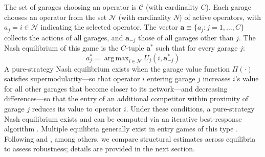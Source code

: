 \documentclass[12pt]{article}
\DeclareMathOperator*{\argmax}{arg\,max}
\begin{document}
The set of garages choosing an operator is $\mathcal{C}$ (with cardinality 
$C$). Each garage chooses an operator from the set $\mathcal{N}$ (with 
cardinality $N$) of active operators, with $a_{j} = i \in \mathcal{N}$ 
indicating the selected operator. The vector $\mathbf{a} \equiv \{a_{j} : j = 
1, \dots, C\}$ collects the actions of all garages, and $\mathbf{a}_{-j}$ 
those of all garages other than $j$. The Nash equilibrium of this game is the 
$C$-tuple $\mathbf{a}^*$ such that for every garage $j$:
\begin{equation}\label{eq:garagechoice}
a_{j}^* = \argmax_{i \in \mathcal{N}} U_{j}(i,\mathbf{a}_{-j}^*)
\end{equation}
\sloppy A pure-strategy Nash equilibrium exists when the garage value function 
$\Pi(\cdot)$ satisfies supermodularity---so that operator $i$ entering 
garage $j$ increases $i$'s value for all other garages that become closer 
to its network---and decreasing differences---so that the entry of an 
additional competitor within proximity of garage $j$ reduces its value to 
operator $i$. Under these conditions, a pure-strategy Nash equilibrium 
exists and can be computed via an iterative best-response algorithm 
\citep{topkis1978minimizing, topkis1979equilibrium}. Multiple equilibria 
generally exist in entry games of this type 
\citep[see][]{aguirregabiria2016empirical}. Following \citet{Jia2008} and 
\citet{nishida2015estimating}, among others, we compare structural estimates 
across equilibria to assess robustness; details are provided in 
the next section. 

\end{document}
